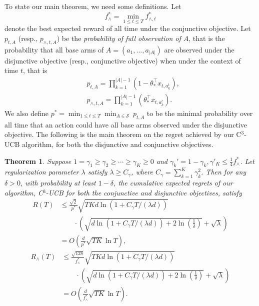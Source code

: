 \documentclass{article}
\newcommand{\cS}{\mathcal{S}}
\newcommand{\abs}[1]{\left| #1 \right|}
\newtheorem{theorem}{Theorem}[section]
\begin{document}
To state our main theorem, we need some definitions. Let
$$
f_{\wedge}^* = \min_{1 \leq t \leq T} f_{\wedge, t}^{\ast}
$$
denote the best expected reward of all time under the conjunctive objective.
Let $p_{t, A}$ (resp., $p_{\wedge, t, A}$) be the {\em probability of full
	observation of $A$}, that is the probability that all base arms of $A = (a_1, \ldots, a_{\abs{A}})$ are observed under the disjunctive objective (resp., conjunctive objective) when under the context of time $t$, that is 
\begin{align*}
&p_{t, A} = \prod_{k=1}^{\abs{A}-1} (1 - \theta_{\ast}^{\top} x_{t, a_k^t}),\\
&p_{\wedge, t, A} = \prod_{k=1}^{\abs{A}-1} (\theta_{\ast}^{\top} x_{t, a_k^t}).
\end{align*}
We also define $p^* = \min_{1 \leq t \leq T} \min_{A \in \cS} ~ p_{t, A}$ to be the minimal probability over all time that an action could have all base arms observed under the disjunctive objective. The following is the main theorem on the regret achieved by our C$^3$-UCB algorithm, for both the disjunctive and conjunctive objectives.
\begin{theorem}
\label{thm:main}
Suppose $1 = \gamma_1 \geq \gamma_2 \geq \cdots \geq \gamma_{K} \geq 0$ and 
$\gamma_k' = 1 - \gamma_k, \gamma'_K \leq \frac{1}{4}f_{\wedge}^{\ast}$.
Let regularization parameter $\lambda$ satisfy $\lambda \geq C_\gamma$, where $C_\gamma = \sum_{k=1}^{K} \gamma_k^2$. Then for any $\delta > 0$, with probability at least $1 - \delta$, the cumulative expected regrets of our algorithm, C$^3$-UCB for both the conjunctive and disjunctive objectives, satisfy
\begin{align}
R(T) &\le \frac{\sqrt{2}}{p^*} \sqrt{TKd\ln(1 + C_\gamma T/(\lambda d))}  \nonumber \\
&\qquad \cdot \left(\sqrt{d\ln(1 + C_\gamma T/(\lambda d)) + 2\ln\left(\frac{1}{\delta}\right)} + \sqrt{\lambda}\right) \nonumber \\
&=O\left(\frac{d}{p^*} \sqrt{TK} \ln T\right),
\end{align}
\begin{align}
R_{\wedge}(T) &\le \frac{\sqrt{128}}{f_{\wedge}^{\ast}} \sqrt{TKd\ln(1 + C_\gamma T/(\lambda d))} \nonumber \\
&\qquad \cdot \left(\sqrt{d\ln(1 + C_\gamma T/(\lambda d)) + 2\ln\left(\frac{1}{\delta}\right)} + \sqrt{\lambda}\right) \nonumber \\
&=O\left(\frac{d}{f_{\wedge}^{\ast}}\sqrt{TK} \ln T\right).
\end{align}
\end{theorem}
\end{document}
